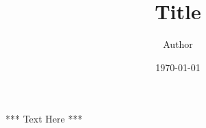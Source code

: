 \documentclass[11pt]{article}
\title{Title}
\author{Author}
\date{\today}
\theoremstyle{definition}
\begin{document}
*** Text Here ***
\end{document}
